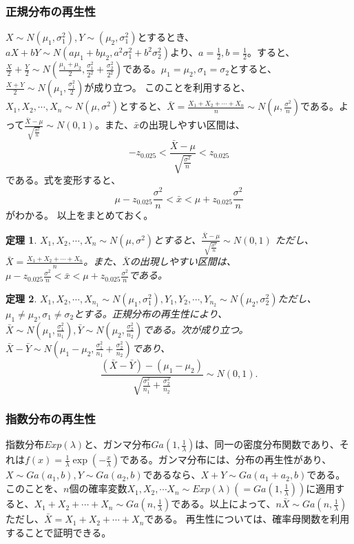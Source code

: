 \documentclass[a4paper,11pt,dvipdfmx]{jsarticle}
\newtheorem{theo}{定理}[section]
\begin{document}
\subsubsection{正規分布の再生性}
$X \sim N(\mu_1,\sigma^2_1),Y\sim(\mu_2,\sigma^2_1)$とするとき、$aX+bY \sim N(a\mu_1+b\mu_2,a^2\sigma^2_1+b^2\sigma^2_2)$より、$a=\frac{1}{2},b=\frac{1}{2}$。すると、$\frac{X}{2}+\frac{Y}{2}\sim N(\frac{\mu_1+\mu_2}{2},\frac{\sigma^2_1}{2^2}+\frac{\sigma^2_2}{2^2})$である。$\mu_1=\mu_2,\sigma_1=\sigma_2$とすると、$\frac{X+Y}{2}\sim N(\mu_1,\frac{\sigma^2_1}{2})$が成り立つ。
このことを利用すると、$X_1,X_2,\cdots,X_n\sim N(\mu,\sigma^2)$とすると、$\bar{X}=\frac{X_1+X_2+\cdots+X_n}{n}\sim N(\mu,\frac{\sigma^2}{n})$である。よって$\frac{\bar{X}-\mu}{\sqrt{\frac{\sigma^2}{n}}}\sim N(0,1) $。また、$\bar{x}$の出現しやすい区間は、
\begin{equation*}
    -z_{0.025}<\frac{\bar{X}-\mu}{\sqrt{\frac{\sigma^2}{n}}} < z_{0.025}
\end{equation*}
である。式を変形すると、
\begin{equation*}
    \mu-z_{0.025}\frac{\sigma^2}{n}<\bar{x}<\mu+z_{0.025}\frac{\sigma^2}{n}
\end{equation*}
がわかる。
以上をまとめておく。

\begin{theo}
    $X_1,X_2,\cdots,X_n \sim N(\mu,\sigma^2)$とすると、$\frac{\bar{X}-\mu}{\sqrt{\frac{\sigma^2}{n}}}\sim N(0,1)$ ただし、$\bar{X}=\frac{X_1+X_2+\cdots+X_n}{n}$。また、$\bar{X}$の出現しやすい区間は、$\mu-z_{0.025}\frac{\sigma^2}{n}<\bar{x}<\mu+z_{0.025}\frac{\sigma^2}{n}$である。
\end{theo}



\begin{theo}
    $X_1,X_2,\cdots,X_{n_1} \sim N(\mu_1,\sigma_1^2),Y_1,Y_2,\cdots,Y_{n_2}\sim N(\mu_2,\sigma_2^2)$ただし、$\mu_1\neq \mu_2,\sigma_1\neq \sigma_2$とする。正規分布の再生性により、$\bar{X}\sim N(\mu_1,\frac{\sigma^2_1}{n_1}),\bar{Y}\sim N(\mu_2,\frac{\sigma^2_2}{n_2})$である。次が成り立つ。
    $\bar{X}-\bar{Y} \sim N(\mu_1-\mu_2,\frac{\sigma^2_1}{n_1}+\frac{\sigma^2_2}{n_2})$であり、
    \begin{equation*}
        \frac{(\bar{X}-\bar{Y})-(\mu_1-\mu_2)}{\sqrt{\frac{\sigma_1^2}{n_1}+ \frac{\sigma_2^2}{n_2}}}\sim N(0,1).
    \end{equation*}
\end{theo}



\subsubsection{指数分布の再生性}
指数分布$Exp(\lambda)$と、ガンマ分布$Ga(1,\frac{1}{\lambda})$は、同一の密度分布関数であり、それは$f(x) = \frac{1}{\lambda} \exp(-\frac{x}{\lambda})$である。ガンマ分布には、分布の再生性があり、$X\sim Ga(a_1,b),Y\sim Ga(a_2,b)$であるなら、$X+Y \sim Ga(a_1+a_2,b)$である。このことを、$n$個の確率変数$X_1,X_2,\cdots X_n \sim Exp(\lambda)(=Ga(1,\frac{1}{\lambda}) )$に適用すると、$X_1+X_2+\cdots+X_n \sim Ga(n,\frac{1}{\lambda})$である。以上によって、$n\bar{X}\sim Ga(n,\frac{1}{\lambda})$ただし、$\bar{X}=X_1+X_2+\cdots+X_n$である。
再生性については、確率母関数を利用することで証明できる。
\end{document}
